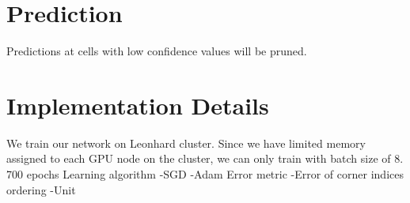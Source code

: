 \section{Prediction}
Predictions at cells with low confidence values will be pruned.

\section{Implementation Details}

We train our network on Leonhard cluster. Since we have limited memory assigned to each GPU node  on the cluster, we can only train with batch size of 8.
700 epochs
Learning algorithm
-SGD
-Adam
Error metric
-Error of corner indices ordering
-Unit

